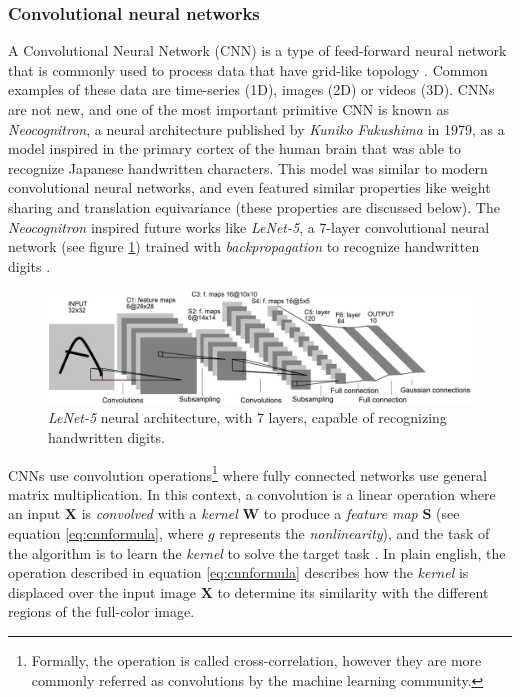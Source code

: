 \subsubsection{Convolutional neural networks}
A Convolutional Neural Network (CNN) is a type of feed-forward neural network that is commonly used to process data that have grid-like topology \autocite{Goodfellow2016}. Common examples of these data are time-series (1D), images (2D) or videos (3D). CNNs are not new, and one of the most important primitive CNN is known as \textit{Neocognitron}, a neural architecture published by \textit{Kuniko Fukushima} \autocite{fukushima1980} in 1979, as a model inspired in the primary cortex of the human brain that was able to recognize Japanese handwritten characters. This model was similar to modern convolutional neural networks, and even featured similar properties like weight sharing and translation equivariance (these properties are discussed below). The \textit{Neocognitron} inspired future works like \textit{LeNet-5}, a 7-layer convolutional neural network (see figure \ref{fig:lenet5}) trained with \textit{backpropagation} to recognize handwritten digits \autocite{lecun1998}.

\begin{figure}
	\centering
	\includegraphics[width=0.7\linewidth]{chapter2/images/lenet5}
	\caption{\textit{LeNet-5} neural architecture, with 7 layers, capable of recognizing handwritten digits.}
	\label{fig:lenet5}
\end{figure}

CNNs use convolution operations\footnote{Formally, the operation is called cross-correlation, however they are more commonly referred as convolutions by the machine learning community.} where fully connected networks use general matrix multiplication. In this context, a convolution is a linear operation where an input $\mathbf{X}$ is \textit{convolved} with a \textit{kernel} $\mathbf{W}$ to produce a \textit{feature map} $\mathbf{S}$ (see equation \ref{eq:cnnformula}, where $g$ represents the \textit{nonlinearity}), and the task of the algorithm is to learn the \textit{kernel} to solve the target task \autocite{haykin1998}. In plain english, the operation described in equation \ref{eq:cnnformula} describes how the \textit{kernel} is displaced over the input image $\mathbf{X}$ to determine its similarity with the different regions of the full-color image.

